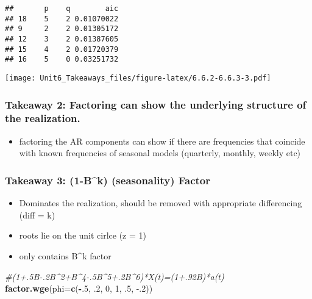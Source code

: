 \documentclass[]{article}
\newenvironment{Shaded}{\begin{snugshade}}{\end{snugshade}}
\newcommand{\CommentTok}[1]{\textcolor[rgb]{0.56,0.35,0.01}{\textit{#1}}}
\newcommand{\DataTypeTok}[1]{\textcolor[rgb]{0.13,0.29,0.53}{#1}}
\newcommand{\DecValTok}[1]{\textcolor[rgb]{0.00,0.00,0.81}{#1}}
\newcommand{\FloatTok}[1]{\textcolor[rgb]{0.00,0.00,0.81}{#1}}
\newcommand{\KeywordTok}[1]{\textcolor[rgb]{0.13,0.29,0.53}{\textbf{#1}}}
\newcommand{\NormalTok}[1]{#1}
\newcommand{\OperatorTok}[1]{\textcolor[rgb]{0.81,0.36,0.00}{\textbf{#1}}}
\providecommand{\tightlist}{%
  \setlength{\itemsep}{0pt}\setlength{\parskip}{0pt}}
\begin{document}
\begin{verbatim}
##       p    q        aic
## 18    5    2 0.01070022
## 9     2    2 0.01305172
## 12    3    2 0.01387605
## 15    4    2 0.01720379
## 16    5    0 0.03251732
\end{verbatim}

\texttt{[image: Unit6\_Takeaways\_files/figure-latex/6.6.2-6.6.3-3.pdf]}

\hypertarget{takeaway-2-factoring-can-show-the-underlying-structure-of-the-realization.}{%
\subsubsection{Takeaway 2: Factoring can show the underlying structure
of the
realization.}\label{takeaway-2-factoring-can-show-the-underlying-structure-of-the-realization.}}

\begin{itemize}
\tightlist
\item
  factoring the AR components can show if there are frequencies that
  coincide with known frequencies of seasonal models (quarterly,
  monthly, weekly etc)
\end{itemize}

\hypertarget{takeaway-3-1-bk-seasonality-factor}{%
\subsubsection{Takeaway 3: (1-B\^{}k) (seasonality)
Factor}\label{takeaway-3-1-bk-seasonality-factor}}

\begin{itemize}
\tightlist
\item
  Dominates the realization, should be removed with appropriate
  differencing (diff = k)
\item
  roots lie on the unit cirlce (z = 1)
\item
  only contains B\^{}k factor
\end{itemize}

\begin{Shaded}
\begin{Highlighting}[]
\CommentTok{#(1+.5B-.2B^2+B^4-.5B^5+.2B^6)*X(t)=(1+.92B)*a(t)}
\KeywordTok{factor.wge}\NormalTok{(}\DataTypeTok{phi=}\KeywordTok{c}\NormalTok{(}\OperatorTok{-}\NormalTok{.}\DecValTok{5}\NormalTok{, }\FloatTok{.2}\NormalTok{, }\DecValTok{0}\NormalTok{, }\DecValTok{1}\NormalTok{, }\FloatTok{.5}\NormalTok{, }\FloatTok{-.2}\NormalTok{))}
\end{Highlighting}
\end{Shaded}
\end{document}
